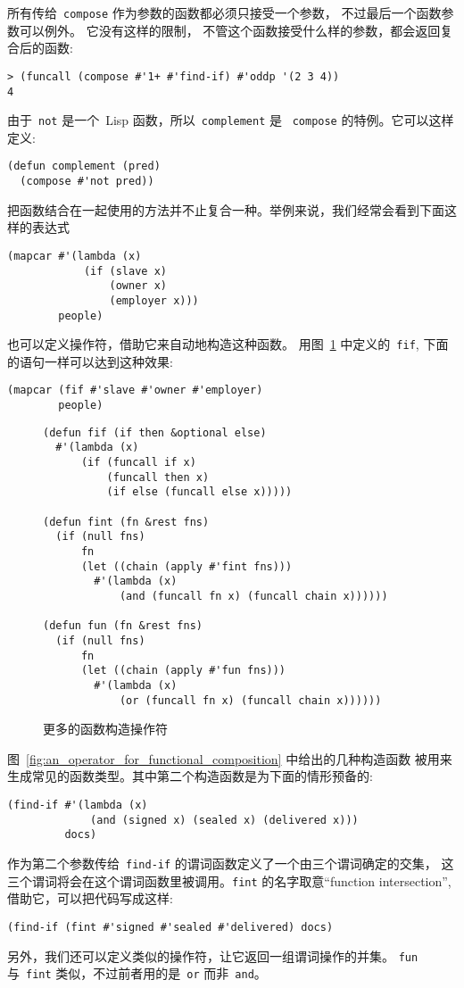 所有传给~\texttt{compose} 作为参数的函数都必须只接受一个参数，
不过最后一个函数参数可以例外。 它没有这样的限制，
不管这个函数接受什么样的参数，都会返回复合后的函数:
\begin{lstlisting}
> (funcall (compose #'1+ #'find-if) #'oddp '(2 3 4))
4
\end{lstlisting}
由于~\texttt{not} 是一个~Lisp 函数，所以~\texttt{complement} 是
~\texttt{compose} 的特例。它可以这样定义:
\begin{lstlisting}
(defun complement (pred)
  (compose #'not pred))
\end{lstlisting}

把函数结合在一起使用的方法并不止复合一种。举例来说，我们经常会看到下面这样的表达式
\begin{lstlisting}
(mapcar #'(lambda (x)
            (if (slave x)
                (owner x)
                (employer x)))
        people)
\end{lstlisting}
也可以定义操作符，借助它来自动地构造这种函数。
用图~\ref{fig:more_function_builders} 中定义的~\texttt{fif},
下面的语句一样可以达到这种效果:
\begin{lstlisting}
(mapcar (fif #'slave #'owner #'employer)
        people)
\end{lstlisting}

\begin{figure}
\begin{lstlisting}
(defun fif (if then &optional else)
  #'(lambda (x)
      (if (funcall if x)
          (funcall then x)
          (if else (funcall else x)))))

(defun fint (fn &rest fns)
  (if (null fns)
      fn
      (let ((chain (apply #'fint fns)))
        #'(lambda (x)
            (and (funcall fn x) (funcall chain x))))))

(defun fun (fn &rest fns)
  (if (null fns)
      fn
      (let ((chain (apply #'fun fns)))
        #'(lambda (x)
            (or (funcall fn x) (funcall chain x))))))
\end{lstlisting}
\caption{\label{fig:more_function_builders}更多的函数构造操作符}
\end{figure}

图~\ref{fig:an_operator_for_functional_composition} 中给出的几种构造函数
被用来生成常见的函数类型。其中第二个构造函数是为下面的情形预备的:
\begin{lstlisting}
(find-if #'(lambda (x)
             (and (signed x) (sealed x) (delivered x)))
         docs)
\end{lstlisting}
作为第二个参数传给~\texttt{find-if} 的谓词函数定义了一个由三个谓词确定的交集，
这三个谓词将会在这个谓词函数里被调用。\texttt{fint} 的名字取意``function intersection'',
借助它，可以把代码写成这样:
\begin{lstlisting}
(find-if (fint #'signed #'sealed #'delivered) docs)
\end{lstlisting}
另外，我们还可以定义类似的操作符，让它返回一组谓词操作的并集。
\texttt{fun} 与~\texttt{fint} 类似，不过前者用的是~\texttt{or} 而非~\texttt{and}。


